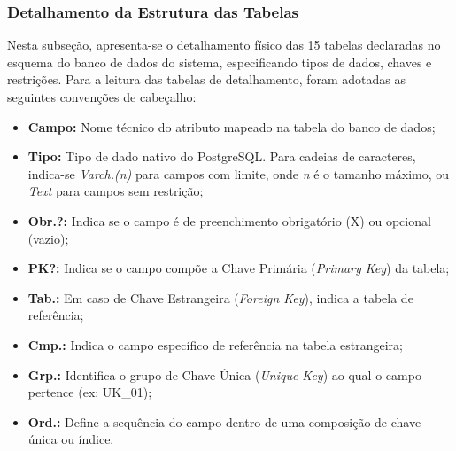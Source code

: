 \subsubsection{Detalhamento da Estrutura das Tabelas}

Nesta subseção, apresenta-se o detalhamento físico das 15 tabelas declaradas no esquema do banco de dados do sistema, especificando tipos de dados, chaves e restrições. Para a leitura das tabelas de detalhamento, foram adotadas as seguintes convenções de cabeçalho:

\begin{itemize}
    \item \textbf{Campo:} Nome técnico do atributo mapeado na tabela do banco de dados;
    \item \textbf{Tipo:} Tipo de dado nativo do PostgreSQL. Para cadeias de caracteres, indica-se \textit{Varch.(n)} para campos com limite, onde \textit{n} é o tamanho máximo, ou \textit{Text} para campos sem restrição;
    \item \textbf{Obr.?:} Indica se o campo é de preenchimento obrigatório (X) ou opcional (vazio);
    \item \textbf{PK?:} Indica se o campo compõe a Chave Primária (\textit{Primary Key}) da tabela;
    \item \textbf{Tab.:} Em caso de Chave Estrangeira (\textit{Foreign Key}), indica a tabela de referência;
    \item \textbf{Cmp.:} Indica o campo específico de referência na tabela estrangeira;
    \item \textbf{Grp.:} Identifica o grupo de Chave Única (\textit{Unique Key}) ao qual o campo pertence (ex: UK\_01);
    \item \textbf{Ord.:} Define a sequência do campo dentro de uma composição de chave única ou índice.
\end{itemize}


